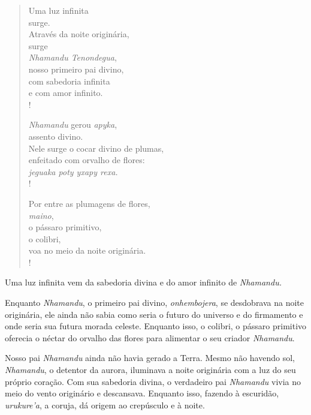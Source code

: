 
 

\begin{verse}
Uma luz infinita\\
surge.\\
Através da noite originária,\\
surge\\
\emph{Nhamandu Tenondegua},\\
nosso primeiro pai divino,\\
com sabedoria infinita\\
e com amor infinito.\\!
 

\emph{Nhamandu} gerou \emph{apyka},\\
assento divino.\\
Nele surge o cocar divino de plumas,\\
enfeitado com orvalho de flores:\\
\emph{jeguaka poty yxapy rexa.}\\!

Por entre as plumagens de flores,\\
\emph{maino},\\
o pássaro primitivo,\\
o colibri,\\
voa no meio da noite originária.\\!
\end{verse}

Uma luz infinita vem da sabedoria divina e do amor infinito
de \emph{Nhamandu.}

 

\asterisc{}


Enquanto \emph{Nhamandu}, o primeiro pai divino, \emph{onhembojera}, se
desdobrava na noite originária, ele ainda não sabia como seria o futuro
do universo e do firmamento e onde seria sua futura morada celeste.
Enquanto isso, o colibri, o pássaro primitivo oferecia o néctar do
orvalho das flores para alimentar o seu criador \emph{Nhamandu}.

Nosso pai \emph{Nhamandu} ainda não havia gerado a Terra. Mesmo não
havendo sol, \emph{Nhamandu}, o detentor da aurora, iluminava a noite
originária com a luz do seu próprio coração. Com sua sabedoria divina, o
verdadeiro pai \emph{Nhamandu} vivia no meio do vento originário e
descansava. Enquanto isso, fazendo à escuridão, \emph{urukure'a}, a
coruja, dá origem ao crepúsculo e à noite.

